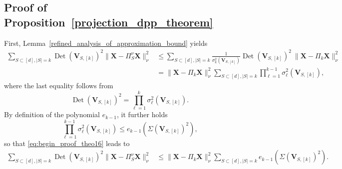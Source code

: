 \documentclass[twoside,11pt]{book}
\numberwithin{theorem}{chapter}
\numberwithin{definition}{chapter}
\numberwithin{proposition}{chapter}
\numberwithin{corollary}{chapter}
\numberwithin{example}{chapter}
\numberwithin{lemma}{chapter}
\numberwithin{assumption}{chapter}
\DeclareMathOperator{\Det}{Det}
\DeclareMathOperator{\Vol}{Vol}
\begin{document}
\subsection{Proof of Proposition~\ref{projection_dpp_theorem}}
First, Lemma~\ref{refined_analysis_of_approximation_bound} yields
	\begin{align}
	\sum\limits_{S \subset [d], |S| = k} \Det(\bm{V}_{S,[k]})^{2}\| \bm{X} - \Pi_{S}^{\nu}\bm{X} \|_{\nu}^{2} & \leq  \sum\limits_{S 	\subset [d], |S| = k} \frac{1}{\sigma_{k}^{2}(\bm{V}_{S,[k]})}\Det(\bm{V}_{S,[k]})^{2} \: \|\bm{X} - \Pi_{k}\bm{X}\|_{\nu}^{2}  \nonumber\\
 	& =  \|\bm{X} - \Pi_{k}\bm{X}\|_{\nu}^{2} \sum\limits_{S \subset [d], |S| = k} \prod_{\ell =1}^{k-1}\sigma_{\ell}^{2}(\bm{V}_{S,[k]}),
 \label{eq:begin_proof_theo16}
\end{align}
where the last equality follows from
\begin{equation}
	\Det(\bm{V}_{S,[k]})^{2} = \prod_{\ell =1}^{k}\sigma_{\ell}^{2}(\bm{V}_{S,[k]}).
\end{equation}
By definition of the polynomial $e_{k-1}$, it further holds
\begin{equation}
	\prod_{\ell =1}^{k-1}\sigma_{\ell}^{2}(\bm{V}_{S,[k]}) \leq e_{k-1}(\Sigma(\bm{V}_{S,[k]})^{2}),
\end{equation}
so that \eqref{eq:begin_proof_theo16} leads to
\begin{align}
\sum\limits_{S \subset [d], |S| = k} \Det(\bm{V}_{S,[k]})^{2}\| \bm{X} - \Pi_{S}^{\nu}\bm{X} \|_{\nu}^{2} & \leq  \|\bm{X} - \Pi_{k}\bm{X}\|_{\nu}^{2} \sum\limits_{S \subset [d], |S| = k} e_{k-1}(\Sigma(\bm{V}_{S,[k]})^{2}).
\label{eq:middle_proof_theo16}
\end{align}
\end{document}
